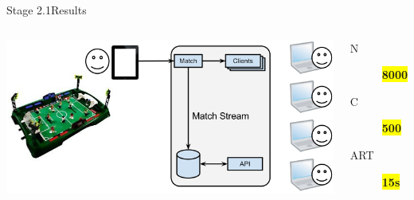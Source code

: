 \documentclass[utf8]{beamer}
\begin{document}
\begin{frame}{Stage 2.1}{Results}
	\begin{columns}
			\includegraphics[top=-1,width=\textwidth]{img/results-3-1.png}
			\begin{description}
				\item[N] \textbf{\colorbox{yellow}{\Large 8000}}
				\item[C] \textbf{\colorbox{yellow}{\Large 500}}
				\item[ART] \textbf{\colorbox{yellow}{\color{red}\Large 15s}}
			\end{description}
	\end{columns}
\end{frame}
\end{document}
